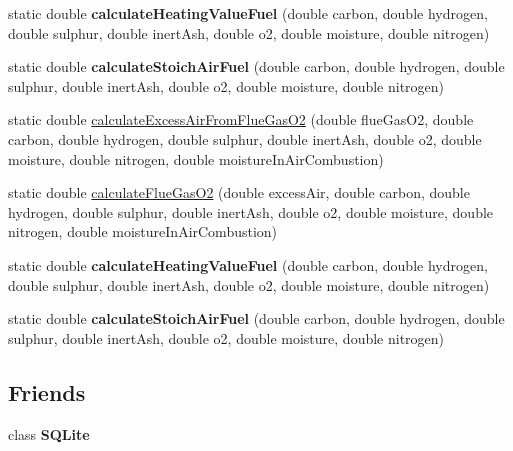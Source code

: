 \begin{DoxyCompactItemize}
static double {\bfseries calculate\+Heating\+Value\+Fuel} (double carbon, double hydrogen, double sulphur, double inert\+Ash, double o2, double moisture, double nitrogen)
\item 
\mbox{\label{class_solid_liquid_flue_gas_material_a61408e175b51363f9dfaf44f5be10163}} 
static double {\bfseries calculate\+Stoich\+Air\+Fuel} (double carbon, double hydrogen, double sulphur, double inert\+Ash, double o2, double moisture, double nitrogen)
\item 
static double \hyperlink{class_solid_liquid_flue_gas_material_abecacec1d6f108a8cdf002a9f67972c7}{calculate\+Excess\+Air\+From\+Flue\+Gas\+O2} (double flue\+Gas\+O2, double carbon, double hydrogen, double sulphur, double inert\+Ash, double o2, double moisture, double nitrogen, double moisture\+In\+Air\+Combustion)
\item 
static double \hyperlink{class_solid_liquid_flue_gas_material_a33152fce2511a4db7240461a7de950a5}{calculate\+Flue\+Gas\+O2} (double excess\+Air, double carbon, double hydrogen, double sulphur, double inert\+Ash, double o2, double moisture, double nitrogen, double moisture\+In\+Air\+Combustion)
\item 
\mbox{\label{class_solid_liquid_flue_gas_material_a301ff1dc16086e191638b881a553539d}} 
static double {\bfseries calculate\+Heating\+Value\+Fuel} (double carbon, double hydrogen, double sulphur, double inert\+Ash, double o2, double moisture, double nitrogen)
\item 
\mbox{\label{class_solid_liquid_flue_gas_material_a61408e175b51363f9dfaf44f5be10163}} 
static double {\bfseries calculate\+Stoich\+Air\+Fuel} (double carbon, double hydrogen, double sulphur, double inert\+Ash, double o2, double moisture, double nitrogen)
\end{DoxyCompactItemize}
\subsection*{Friends}
\begin{DoxyCompactItemize}
\item 
\mbox{\label{class_solid_liquid_flue_gas_material_a0102f3b3c0cbf96db6c49f071fa5e7cc}} 
class {\bfseries S\+Q\+Lite}
\end{DoxyCompactItemize}



